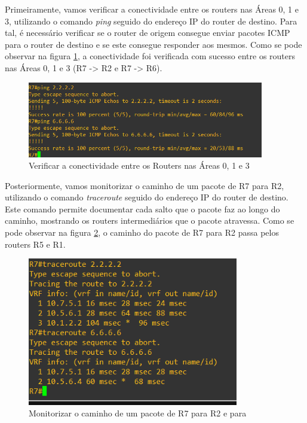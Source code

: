 \documentclass[11pt,english, openright, oneside]{book}
\begin{document}
\par Primeiramente, vamos verificar a conectividade entre os routers nas Áreas 0, 1 e 3, utilizando o comando \textit{ping} seguido do endereço IP do router de destino. Para tal, é necessário verificar se o router de origem consegue enviar pacotes ICMP para o router de destino e se este consegue responder aos mesmos. Como se pode observar na figura \ref{fig:config27}, a conectividade foi verificada com sucesso entre os routers nas Áreas 0, 1 e 3 (R7 -> R2 e R7 -> R6).

\begin{figure}[H]
    \centering
    \includegraphics[width=0.92\textwidth]{imagens/Tarefa3/16.ping_R7_R2_R6.png}
    \caption{Verificar a conectividade entre os Routers nas Áreas 0, 1 e 3}
    \label{fig:config27}
\end{figure}
\vspace{0.2cm}

\par Posteriormente, vamos monitorizar o caminho de um pacote de R7 para R2, utilizando o comando \textit{traceroute} seguido do endereço IP do router de destino. Este comando permite documentar cada salto que o pacote faz ao longo do caminho, mostrando os routers intermediários que o pacote atravessa. Como se pode observar na figura \ref{fig:config28}, o caminho do pacote de R7 para R2 passa pelos routers R5 e R1.

\begin{figure}[H]
    \centering
    \includegraphics[width=0.82\textwidth]{imagens/Tarefa3/16.traceroute_R7_R2_R6.png}
    \caption{Monitorizar o caminho de um pacote de R7 para R2 e para }
    \label{fig:config28}
\end{figure}
\vspace{0.2cm}
\end{document}
